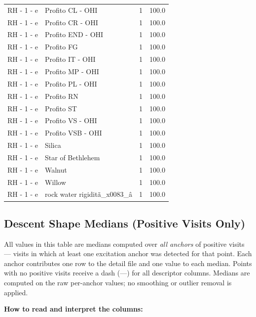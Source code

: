 \documentclass[a4paper,11pt]{article}
\begin{document}
\begin{footnotesize}
\begin{longtable}{p{3.5cm}p{7.5cm}rr}
RH - 1 - e & Profito CL - OHI & 1 & 100.0 \\
RH - 1 - e & Profito CR - OHI & 1 & 100.0 \\
RH - 1 - e & Profito END - OHI & 1 & 100.0 \\
RH - 1 - e & Profito FG & 1 & 100.0 \\
RH - 1 - e & Profito IT - OHI & 1 & 100.0 \\
RH - 1 - e & Profito MP - OHI & 1 & 100.0 \\
RH - 1 - e & Profito PL - OHI & 1 & 100.0 \\
RH - 1 - e & Profito RN & 1 & 100.0 \\
RH - 1 - e & Profito ST & 1 & 100.0 \\
RH - 1 - e & Profito VS - OHI & 1 & 100.0 \\
RH - 1 - e & Profito VSB - OHI & 1 & 100.0 \\
RH - 1 - e & Silica & 1 & 100.0 \\
RH - 1 - e & Star of Bethlehem & 1 & 100.0 \\
RH - 1 - e & Walnut & 1 & 100.0 \\
RH - 1 - e & Willow & 1 & 100.0 \\
RH - 1 - e & rock water rigiditã\_x0083\_â & 1 & 100.0 \\
\end{longtable}
\end{footnotesize}

\subsection{Descent Shape Medians (Positive Visits Only)}

All values in this table are medians computed over \emph{all anchors} of positive visits ---
visits in which at least one excitation anchor was detected for that point. Each anchor
contributes one row to the detail file and one value to each median. Points with no positive
visits receive a dash (---) for all descriptor columns.
Medians are computed on the raw per-anchor values; no smoothing or outlier removal is
applied.

\medskip
\noindent\textbf{How to read and interpret the columns:}
\end{document}
